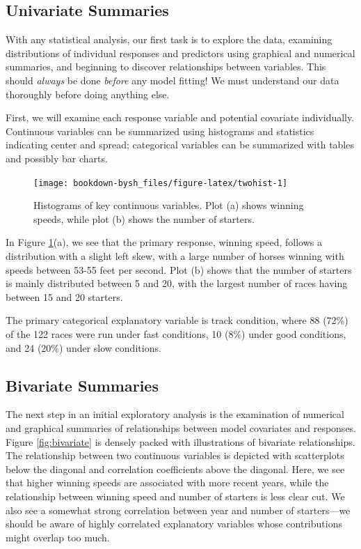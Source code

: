\documentclass[
]{krantz}
\begin{document}
\hypertarget{univariate-summaries}{%
\subsection{Univariate Summaries}\label{univariate-summaries}}

With any statistical analysis, our first task is to explore the data, examining distributions of individual responses and predictors using graphical and numerical summaries, and beginning to discover relationships between variables. This should \emph{always} be done \emph{before} any model fitting! We must understand our data thoroughly before doing anything else.

First, we will examine each response variable and potential covariate individually. Continuous variables can be summarized using histograms and statistics indicating center and spread; categorical variables can be summarized with tables and possibly bar charts.

\begin{figure}

{\centering \texttt{[image: bookdown-bysh\_files/figure-latex/twohist-1]} 

}

\caption{Histograms of key continuous variables.  Plot (a) shows winning speeds, while plot (b) shows the number of starters.}\label{fig:twohist}
\end{figure}

In Figure \ref{fig:twohist}(a), we see that the primary response, winning speed, follows a distribution with a slight left skew, with a large number of horses winning with speeds between 53-55 feet per second. Plot (b) shows that the number of starters is mainly distributed between 5 and 20, with the largest number of races having between 15 and 20 starters.

The primary categorical explanatory variable is track condition, where 88 (72\%) of the 122 races were run under fast conditions, 10 (8\%) under good conditions, and 24 (20\%) under slow conditions.

\hypertarget{bivariate-summaries}{%
\subsection{Bivariate Summaries}\label{bivariate-summaries}}

The next step in an initial exploratory analysis is the examination of numerical and graphical summaries of relationships between model covariates and responses. Figure \ref{fig:bivariate} is densely packed with illustrations of bivariate relationships. The relationship between two continuous variables is depicted with scatterplots below the diagonal and correlation coefficients above the diagonal. Here, we see that higher winning speeds are associated with more recent years, while the relationship between winning speed and number of starters is less clear cut. We also see a somewhat strong correlation between year and number of starters---we should be aware of highly correlated explanatory variables whose contributions might overlap too much.
\end{document}
